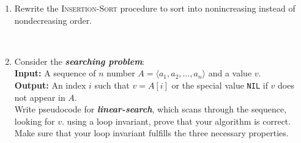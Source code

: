 \documentclass[Chapter02]{subfiles}
\begin{document}
\begin{enumerate}[leftmargin=\labelsep]
\begin{answer}
\begin{figure}[H]
\begin{subfloatrow}[3]
{{
						}
					}

				\end{subfloatrow}
			\end{figure}
		\end{answer}

		\item Rewrite the \textsc{Insertion-Sort} procedure to sort into nonincreasing instead of nondecreasing order.
		\begin{answer}
			\hfill\\
			\begin{algorithm}[H]

			\end{algorithm}
		\end{answer}

		\item Consider the \textbf{\textit{searching problem}}:\\[.5em]
		\textbf{Input:} A sequence of $n$ number $A = \langle a_1, a_2, \dots, a_n \rangle$ and a value $v$.\\[.5em]
		\textbf{Output:} An index $i$ such that $v = A[i]$ or the special value \texttt{NIL} if $v$ does not appear in $A$.\\[.5em]
		Write pseudocode for \textbf{\textit{linear-search}}, which scans through the sequence, looking for $v$. using a loop invariant, prove that your algorithm is correct. Make sure that your loop invariant fulfills the three necessary properties.
		\begin{answer}
			

\end{answer}
\end{enumerate}
\end{document}
